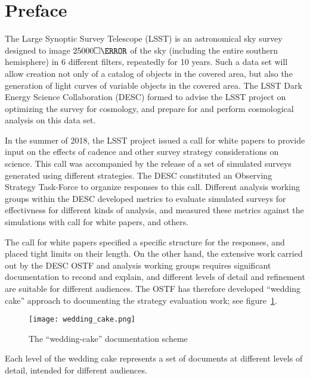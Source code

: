 \section*{Preface}

The Large Synoptic Survey Telescope (LSST) is an astronomical sky
survey designed to image $25000\square\degree$ of the sky (including
the entire southern hemisphere) in 6 different filters, repeatedly for
10 years. Such a data set will allow creation not only of a catalog of
objects in the covered area, but also the generation of light curves
of variable objects in the covered area. The LSST Dark Energy Science
Collaboration (DESC) formed to advise the LSST project on optimizing
the survey for cosmology, and prepare for and perform cosmological
analysis on this data set.

In the summer of 2018, the LSST project issued a call for white papers
to provide input on the effects of cadence and other survey strategy
considerations on science. This call was accompanied by the release of
a set of simulated surveys generated using different strategies. The
DESC constituted an Observing Strategy Task-Force to organize
responses to this call. Different analysis working groups within the
DESC developed metrics to evaluate simulated surveys for effectivness
for different kinds of analysis, and measured these metrics against
the simulations with call for white papers, and others.

The call for white papers specified a specific structure for the
responses, and placed tight limits on their length. On the other hand,
the extensive work carried out by the DESC OSTF and analysis working
groups requires significant documentation to recond and explain, and
different levels of detail and refinement are suitable for different
audiences. The OSTF has therefore developed ``wedding cake'' approach
to documenting the strategy evaluation work; see
figure~\ref{fig:weddingcake}.

\begin{figure}[here]
  \centering
  \texttt{[image: wedding\_cake.png]}
  \caption{The ``wedding-cake'' documentation scheme}
  \label{fig:weddingcake}
\end{figure}

Each level of the wedding cake represents a set of documents at
different levels of detail, intended for different audiences.

